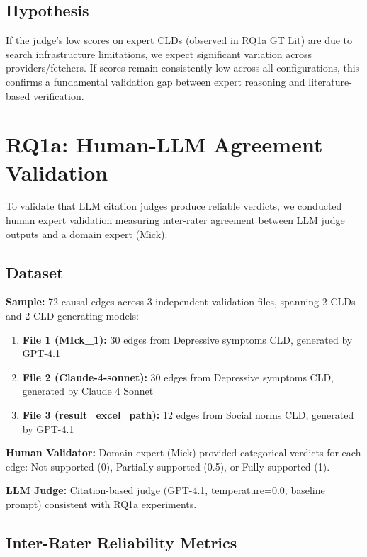 \subsection{Hypothesis}

If the judge's low scores on expert CLDs (observed in RQ1a GT Lit) are due to search infrastructure limitations, we expect significant variation across providers/fetchers. If scores remain consistently low across all configurations, this confirms a fundamental validation gap between expert reasoning and literature-based verification.

\section{RQ1a: Human-LLM Agreement Validation}

To validate that LLM citation judges produce reliable verdicts, we conducted human expert validation measuring inter-rater agreement between LLM judge outputs and a domain expert (Mick).

\subsection{Dataset}

\textbf{Sample:} 72 causal edges across 3 independent validation files, spanning 2 CLDs and 2 CLD-generating models:
\begin{enumerate}[noitemsep]
    \item \textbf{File 1 (MIck\_1):} 30 edges from Depressive symptoms CLD, generated by GPT-4.1
    \item \textbf{File 2 (Claude-4-sonnet):} 30 edges from Depressive symptoms CLD, generated by Claude 4 Sonnet
    \item \textbf{File 3 (result\_excel\_path):} 12 edges from Social norms CLD, generated by GPT-4.1
\end{enumerate}

\textbf{Human Validator:} Domain expert (Mick) provided categorical verdicts for each edge: Not supported (0), Partially supported (0.5), or Fully supported (1).

\textbf{LLM Judge:} Citation-based judge (GPT-4.1, temperature=0.0, baseline prompt) consistent with RQ1a experiments.

\subsection{Inter-Rater Reliability Metrics}

